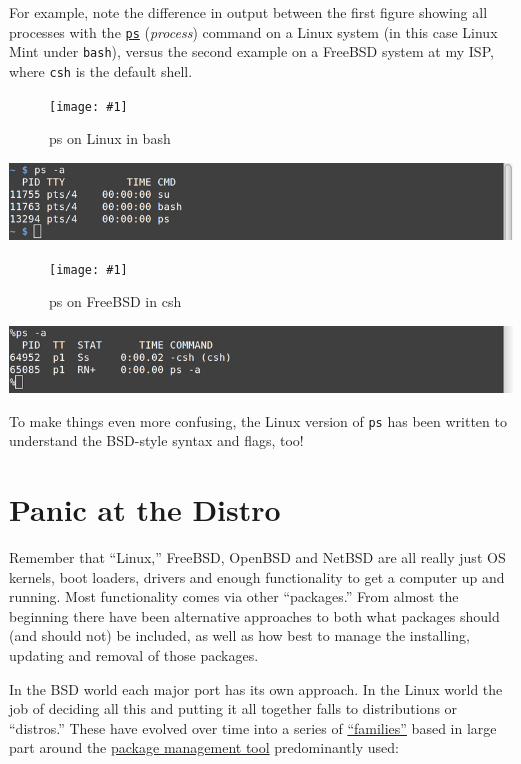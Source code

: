 \documentclass[10pt,]{book}
\numberwithin{figure}{chapter}
\DeclareRobustCommand{\fimg}[3]{
\ifxetex
\begin{figure}[H]
\texttt{[image: \#1]}
\caption{#2}
\label{fig:#3}
\end{figure}
\fi}
\DeclareRobustCommand{\fref}[1]{\ifxetex{(Figure \ref{fig:#1})}\fi}
\begin{document}
For example, note the difference in output between the first figure
\fref{ps-on-linux-in-bash} showing all processes with the
\href{http://linux.die.net/man/1/ps}{\texttt{ps}} (\emph{process})
command on a Linux system (in this case Linux Mint under \texttt{bash}),
versus the second example \fref{ps-on-freebsd-in-csh} on a FreeBSD
system at my ISP, where \texttt{csh} is the default shell.

\ifxetex\fimg{./images/ps-a-bash.png}{ps on Linux in bash}{ps-on-linux-in-bash}
\else
\includegraphics{./images/ps-a-bash.png} \fi

\ifxetex\fimg{./images/ps-a-csh.png}{ps on FreeBSD in csh}{ps-on-freebsd-in-csh}
\else
\includegraphics{./images/ps-a-csh.png} \fi

To make things even more confusing, the Linux version of \texttt{ps} has
been written to understand the BSD-style syntax and flags, too!

\section{Panic at the Distro}\label{panic-at-the-distro}

Remember that ``Linux,'' FreeBSD, OpenBSD and NetBSD are all really just
OS kernels, boot loaders, drivers and enough functionality to get a
computer up and running. Most functionality comes via other
``packages.'' From almost the beginning there have been alternative
approaches to both what packages should (and should not) be included, as
well as how best to manage the installing, updating and removal of those
packages.

In the BSD world each major port has its own approach. In the Linux
world the job of deciding all this and putting it all together falls to
distributions or ``distros.''  These have evolved
over time into a series of
\href{https://en.wikipedia.org/wiki/Linux_distribution\#Popular_distributions}{``families''}
based in large part around the
\href{https://en.wikipedia.org/wiki/Package_manager}{package management
tool} predominantly used:
\end{document}

